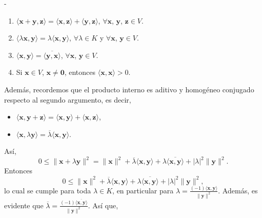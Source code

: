 \begin{theorem}
\begin{adjustwidth}{0mm}{-\wholeMargin}
\begin{minipage}[c]{7.7cm}
{{            \begin{enumerate}[label=\roman*)]
                \item $\langle \mathbf{x} + \mathbf{y}, \mathbf{z} \rangle = \langle \mathbf{x}, \mathbf{z} \rangle + \langle \mathbf{y}, \mathbf{z} \rangle$, $\forall \mathbf{x}$, $\mathbf{y}$, $\mathbf{z} \in V$.
                \item $\langle \lambda \mathbf{x}, \mathbf{y} \rangle = \lambda \langle \mathbf{x}, \mathbf{y} \rangle$, $\forall \lambda \in K$ y $\forall \mathbf{x}$, $\mathbf{y} \in V$.
                \item $\langle \mathbf{x}, \mathbf{y} \rangle = \overline{\langle \mathbf{y}, \mathbf{x} \rangle}$, $\forall \mathbf{x}$, $\mathbf{y} \in V$.
                \item Si $\mathbf{x} \in V$, $\mathbf{x} \neq \mathbf{0}$, entonces $\langle \mathbf{x}, \mathbf{x} \rangle > 0$.\\[-2mm]
            \end{enumerate}
            Además, recordemos que el producto interno es aditivo y homogéneo conjugado respecto al segundo argumento, es decir,\\[-2mm]
            \begin{itemize}
                \item $\langle \mathbf{x}, \mathbf{y} + \mathbf{z} \rangle = \langle \mathbf{x}, \mathbf{y} \rangle + \langle \mathbf{x}, \mathbf{z} \rangle$,
                \item $\langle \mathbf{x}, \lambda \mathbf{y} \rangle = \overline{\lambda} \langle \mathbf{x}, \mathbf{y} \rangle$.
            \end{itemize}
        }}
        \end{minipage}
    \end{adjustwidth}\vspace{-0.3cm}
    Así,
    $$0 \leq \| \mathbf{x} + \lambda \mathbf{y} \|^2 = \| \mathbf{x} \|^2 + \overline{\lambda} \langle \mathbf{x}, \mathbf{y} \rangle + \lambda \overline{\langle \mathbf{x}, \mathbf{y} \rangle} + |\lambda|^2 \| \mathbf{y} \|^2.$$
    Entonces
    \begin{equation}
        0 \leq \| \mathbf{x} \|^2 + \overline{\lambda} \langle \mathbf{x}, \mathbf{y} \rangle + \lambda \overline{\langle \mathbf{x}, \mathbf{y} \rangle} + |\lambda|^2 \| \mathbf{y} \|^2, \label{desigualdad-cauchy}
    \end{equation}
    lo cual se cumple para toda $\lambda \in K$, en particular para $\displaystyle \lambda = \frac{(-1)\langle \mathbf{x}, \mathbf{y} \rangle}{\| \mathbf{y} \|^2}$. Además, es evidente que $\displaystyle \overline{\lambda} = \frac{(-1)\overline{\langle \mathbf{x}, \mathbf{y} \rangle}}{\| \mathbf{y} \|^2}$. Así que,

\end{theorem}
